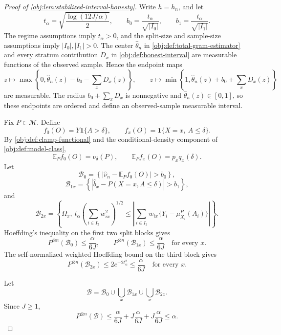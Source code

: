\documentclass[11pt]{article}
\begin{document}
\begin{proof}[Proof of \cref{obj:lem:stabilized-interval-honesty}]
Write \(h=h_n\), and let
\[
        t_\alpha=\sqrt{\frac{\log(12J/\alpha)}{2}},
        \qquad
        b_0=\frac{t_\alpha}{\sqrt{|I_0|}},
        \qquad
        b_1=\frac{t_\alpha}{\sqrt{|I_1|}} .
\]
The regime assumptions imply \(t_\alpha>0\), and the split-size and sample-size assumptions imply \(|I_0|,|I_1|>0\).  The center \(\widehat\theta_n\) in \cref{obj:def:total-gram-estimator} and every stratum contribution \(D_x\) in \cref{obj:def:honest-interval} are measurable functions of the observed sample.  Hence the endpoint maps
\[
        z\mapsto
        \max\!\left\{0,\widehat\theta_n(z)-b_0-\sum_xD_x(z)\right\},
        \qquad
        z\mapsto
        \min\!\left\{1,\widehat\theta_n(z)+b_0+\sum_xD_x(z)\right\}
\]
are measurable.  The radius \(b_0+\sum_xD_x\) is nonnegative and \(\widehat\theta_n(z)\in[0,1]\), so these endpoints are ordered and define an observed-sample measurable interval. %

Fix \(P\in\mathcal M\).  Define
\[
 f_0(O)=Y\mathbf 1\{A>\delta\},
 \qquad
 f_x(O)=\mathbf 1\{X=x,\ A\le\delta\}.
\]
By \cref{obj:def:clamp-functional} and the conditional-density component of \cref{obj:def:model-class},
\[
        \mathbb E_P f_0(O)=\nu_\delta(P),
        \qquad
        \mathbb E_P f_x(O)=p_xq_x(\delta).
\]
Let
\[
\mathcal B_0=
\left\{
\left|
\widehat\nu_n-\mathbb E_P f_0(O)
\right|>b_0
\right\},
\]
\[
\mathcal B_{1x}=
\left\{
\left|
\widehat b_x-P(X=x,A\le\delta)
\right|>b_1
\right\},
\]
and
\[
\mathcal B_{2x}=
\left\{
\Omega_x,
\ t_\alpha\left(\sum_{i\in I_2}w_{ix}^2\right)^{1/2}
\le
\left|
\sum_{i\in I_2}w_{ix}\{Y_i-\mu^P_{X_i}(A_i)\}
\right|
\right\}.
\]
Hoeffding's inequality on the first two split blocks gives
\[
        P^{\otimes n}(\mathcal B_0)
        \le \frac{\alpha}{6J},
        \qquad
        P^{\otimes n}(\mathcal B_{1x})
        \le \frac{\alpha}{6J}
        \quad\text{for every }x .
\]
The self-normalized weighted Hoeffding bound on the third block gives
\[
        P^{\otimes n}(\mathcal B_{2x})
        \le
        2e^{-2t_\alpha^2}
        \le
        \frac{\alpha}{6J}
        \quad\text{for every }x .
\]

Let
\[
        \mathcal B
        =
        \mathcal B_0\cup
        \bigcup_x\mathcal B_{1x}\cup
        \bigcup_x\mathcal B_{2x}.
\]
Since \(J\ge1\),
\[
        P^{\otimes n}(\mathcal B)
        \le
        \frac{\alpha}{6J}
        +J\frac{\alpha}{6J}
        +J\frac{\alpha}{6J}
        \le \alpha .
\]


\end{proof}
\end{document}
